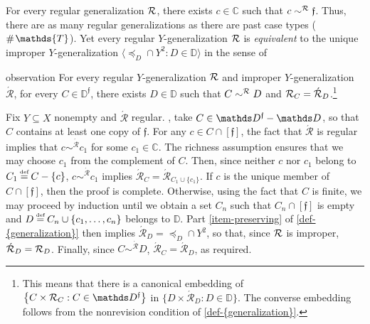 \documentclass[12pt,a4paper,twoside]{article}
\newcommand{\novel}{\mathfrak f}
\newcommand{\preceqb}{\mathbin{\preceq}}
\newcommand{\countof}{\mathbin{\#}\hskip1pt}
\newcommand{\ext}{\mathrel{\mc R}}
\newcommand{\extb}{\mathbin{\mc R}}
\newcommand{\aext}{\mathrel{\acute{\mathrel{\mathcal R}}}}
\newcommand{\aextb}{\mathbin{\acute{\mathbin{\mathcal R}}}}
\newcommand{\mbbd}{{\mathds D}}
\newcommand{\mbbdp}{{\mathds D^{\novel}}}
\newcommand{\mbbc}{{\mathds C}}
\newcommand{\mbbt}{{\mathds {T}}}
\begin{document}

For every regular {generalization} $\ext$, there exists $c \in \mbbc$ such that
$c \sim^{\extb} \novel$. Thus, there are as many regular {generalization}s as there are
past case types (\ie\ $\countof \mbbt$).  Yet every regular $Y$-{generalization} $\ext$
is \emph{equivalent} to the unique improper $Y$-{generalization}
$\langle \preceqb_{D} \cap Y^{2}: D \in \mbbd\rangle$ in the sense of 
\begin{theoremEnd}{observation}\label{obs-reg-eq}%
  For every regular $Y$-{generalization} $\ext$ and improper $Y$-{generalization} $\aext$, for
  every $C \in \mbbdp$, there exists $D \in \mbbd$ such that
  $C \sim^{\extb} D$ and $\extb_{C} = \aextb_{D}$.\footnote{This means that
    there is a canonical embedding of
    $\left\{C \times \extb_{C}: C \in \mbbdp\right\}$ in
    $\{D \times \aextb_{D}: D \in \mbbd\}$. The converse embedding follows from
    the nonrevision condition of \cref{def-{generalization}}.} %
\end{theoremEnd}

\begin{proofEnd}\label{proof-reg-eq} Fix $Y\subseteq
  X$ nonempty and $\aext$ regular.  \Wlog, take $C \in \mbbdp \bs \mbbd$, so
  that $C$ contains at least one copy of $\novel$.  For any $c \in C \cap [
    \novel ]$, the fact that $\aext$ is regular implies that $c \sim^{\aextb} c
  _ 1$ for some $c _ 1 \in \mbbc$.  The richness assumption ensures that we may
  choose $c _ 1$ from the complement of $C$.  Then, since neither $c$ nor
  $c_{1}$ belong to $C _ 1 \defeq C \bs \{c\}$, $c \sim^{\aextb} c_{1}$ implies
  $\aextb_{C} = \aextb _ {C _ 1 \cup \{c_{1}\}}$.  If $c$ is the unique
  member of $C \cap [ \novel ]$, then the proof is complete.  Otherwise, using
  the fact that $C$ is finite, we may proceed by induction until we obtain a
  set $C _ n$ such that $C _ n \cap [\novel ]$ is empty and $D \defeq C _ n
  \cup \{c _ 1 , \dots , c _ n \}$ belongs to $\mbbd$.  Part
  \ref{item-preserving} of \cref{def-{generalization}} then implies $\aextb _ {
    D} = \preceqb _ {D} \cap Y^{2}$, so that, since $\ext$ is
  improper, $\aextb_{D}=\extb_{D}$.  Finally, since $C \sim^{\aextb} D$,
$\aextb _ {C} = \aextb_{D}$, as required.
\end{proofEnd}
\end{document}
